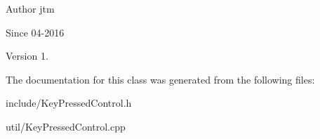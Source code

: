 \begin{DoxyAuthor}{Author}
jtm 
\end{DoxyAuthor}
\begin{DoxySince}{Since}
04-\/2016 
\end{DoxySince}
\begin{DoxyVersion}{Version}
1. 
\end{DoxyVersion}


The documentation for this class was generated from the following files\-:\begin{DoxyCompactItemize}
\item 
include/Key\-Pressed\-Control.\-h\item 
util/Key\-Pressed\-Control.\-cpp\end{DoxyCompactItemize}
